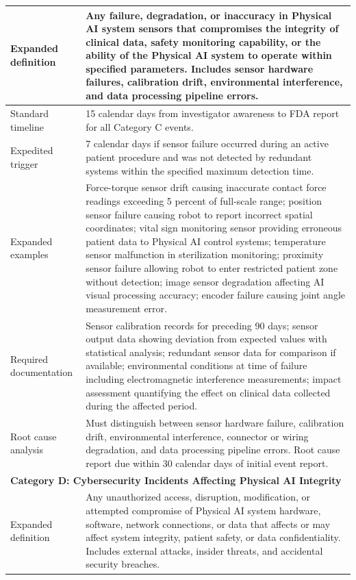 \begin{table}[H]
\begin{tabularx}{\textwidth}{l X}
\midrule
Expanded definition & Any failure, degradation, or inaccuracy in Physical AI system sensors that compromises the integrity of clinical data, safety monitoring capability, or the ability of the Physical AI system to operate within specified parameters. Includes sensor hardware failures, calibration drift, environmental interference, and data processing pipeline errors. \\
\midrule
Standard timeline & 15 calendar days from investigator awareness to FDA report for all Category C events. \\
\midrule
Expedited trigger & 7 calendar days if sensor failure occurred during an active patient procedure and was not detected by redundant systems within the specified maximum detection time. \\
\midrule
Expanded examples & Force-torque sensor drift causing inaccurate contact force readings exceeding 5 percent of full-scale range; position sensor failure causing robot to report incorrect spatial coordinates; vital sign monitoring sensor providing erroneous patient data to Physical AI control systems; temperature sensor malfunction in sterilization monitoring; proximity sensor failure allowing robot to enter restricted patient zone without detection; image sensor degradation affecting AI visual processing accuracy; encoder failure causing joint angle measurement error. \\
\midrule
Required documentation & Sensor calibration records for preceding 90 days; sensor output data showing deviation from expected values with statistical analysis; redundant sensor data for comparison if available; environmental conditions at time of failure including electromagnetic interference measurements; impact assessment quantifying the effect on clinical data collected during the affected period. \\
\midrule
Root cause analysis & Must distinguish between sensor hardware failure, calibration drift, environmental interference, connector or wiring degradation, and data processing pipeline errors. Root cause report due within 30 calendar days of initial event report. \\
\midrule
\multicolumn{2}{l}{\textbf{Category D: Cybersecurity Incidents Affecting Physical AI Integrity}} \\
\midrule
Expanded definition & Any unauthorized access, disruption, modification, or attempted compromise of Physical AI system hardware, software, network connections, or data that affects or may affect system integrity, patient safety, or data confidentiality. Includes external attacks, insider threats, and accidental security breaches. \\

\end{tabularx}
\end{table}
